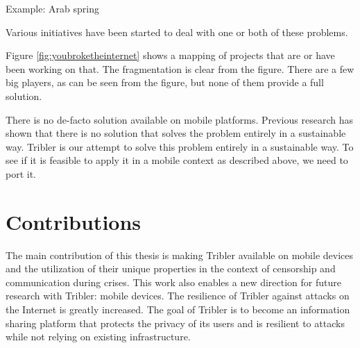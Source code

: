 Example: Arab spring \cite{Johan_2001}


Various initiatives have been started to deal with one or both of these problems. \cite{re_decentralize}

Figure \ref{fig:youbroketheinternet} shows a mapping of projects that are or have been working on that.
The fragmentation is clear from the figure.
There are a few big players, as can be seen from the figure, but none of them provide a full solution.






There is no de-facto solution available on mobile platforms. \cite{literature_survey}
Previous research has shown that there is no solution that solves the problem entirely in a sustainable way.
Tribler is our attempt to solve this problem entirely in a sustainable way.
To see if it is feasible to apply it in a mobile context as described above, we need to port it.


\section{Contributions}
The main contribution of this thesis is making Tribler available on mobile devices and the utilization of their unique properties in the context of censorship and communication during crises.
This work also enables a new direction for future research with Tribler: mobile devices.
The resilience of Tribler against attacks on the Internet is greatly increased.
The goal of Tribler is to become an information sharing platform that protects the privacy of its users and is resilient to attacks while not relying on existing infrastructure.

